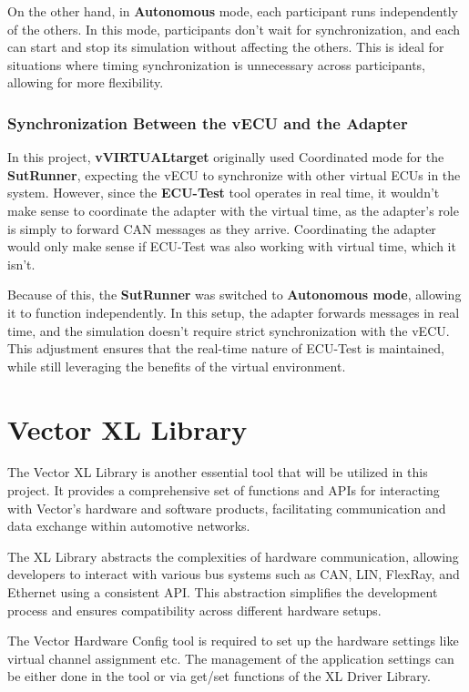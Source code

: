 On the other hand, in \textbf{Autonomous} mode, each participant runs independently of the others. In this mode, participants don’t wait for synchronization, and each can start and stop its simulation without affecting the others. This is ideal for situations where timing synchronization is unnecessary across participants, allowing for more flexibility.

\subsubsection{Synchronization Between the vECU and the Adapter}
In this project, \textbf{vVIRTUALtarget} originally used Coordinated mode for the \textbf{SutRunner}, expecting the vECU to synchronize with other virtual ECUs in the system. However, since the \textbf{ECU-Test} tool operates in real time, it wouldn’t make sense to coordinate the adapter with the virtual time, as the adapter’s role is simply to forward CAN messages as they arrive. Coordinating the adapter would only make sense if ECU-Test was also working with virtual time, which it isn’t.

Because of this, the \textbf{SutRunner} was switched to \textbf{Autonomous mode}, allowing it to function independently. In this setup, the adapter forwards messages in real time, and the simulation doesn’t require strict synchronization with the vECU. This adjustment ensures that the real-time nature of ECU-Test is maintained, while still leveraging the benefits of the virtual environment.

\section{Vector XL Library}
The Vector XL Library is another essential tool that will be utilized in this project. It provides a comprehensive set of functions and APIs for interacting with Vector's hardware and software products, facilitating communication and data exchange within automotive networks.

The XL Library abstracts the complexities of hardware communication, allowing developers to interact with various bus systems such as CAN, LIN, FlexRay, and Ethernet using a consistent API. This abstraction simplifies the development process and ensures compatibility across different hardware setups.

The Vector Hardware Config tool is required to set up the hardware settings like virtual channel assignment etc. The management of the application settings can be either done in the tool or via get/set functions of the XL Driver Library. \cite{xl_driver_library_manual}

